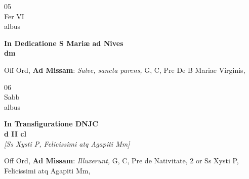 \documentclass[10pt, openany]{book}
\begin{document}
        \begin{center}
            \begin{minipage}{3.5in}
                \vspace{2em}
                \begin{minipage}{0.5in}
                    {\Huge 05} \\
                    {\normalsize Fer VI} \\
                    {\normalsize albus}
                \end{minipage}
                \begin{minipage}{3.0in}
                    \textbf{ \large In Dedicatione S Mariæ ad Nives \\
                    \textnormal{\normalsize dm}} \\ 
                \end{minipage}
                \begin{justify}Off Ord, \textbf{Ad Missam}: \textit{Salve, sancta parens,} G, C, Pre De B Mariae Virginis,  
                \end{justify}
            \end{minipage}
        \end{center}
    
        \begin{center}
            \begin{minipage}{3.5in}
                \vspace{2em}
                \begin{minipage}{0.5in}
                    {\Huge 06} \\
                    {\normalsize Sabb} \\
                    {\normalsize albus}
                \end{minipage}
                \begin{minipage}{3.0in}
                    \textbf{ \large In Transfiguratione DNJC \\
                    \textnormal{\normalsize d II cl}} \\ \textit{[Ss Xysti P, Felicissimi atq Agapiti Mm]} \\ 
                \end{minipage}
                \begin{justify}Off Ord, \textbf{Ad Missam}: \textit{Illuxerunt,} G, C, Pre de Nativitate, 2 or Ss Xysti P, Felicissimi atq Agapiti Mm,  
                \end{justify}
            \end{minipage}
        \end{center}
    
\end{document}
